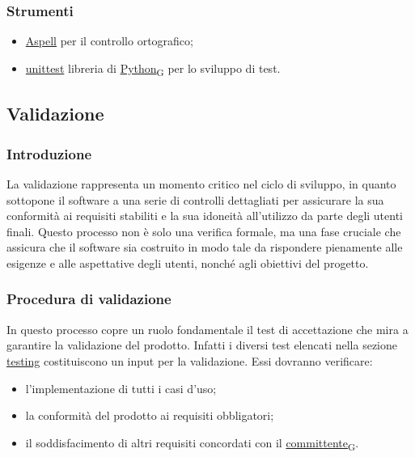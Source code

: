 \subsubsection{Strumenti}

\begin{itemize}
	\item \href{http://aspell.net/}{Aspell} per il controllo ortografico;
	\item \href{https://docs.python.org/3/library/unittest.html}{unittest} libreria di \href{https://7last.github.io/docs/pb/documentazione-interna/glossario\#python}{Python\textsubscript{G}} per lo sviluppo di test.
\end{itemize}



\subsection{Validazione}
\subsubsection{Introduzione}
La validazione rappresenta un momento critico nel ciclo di sviluppo, in quanto sottopone il software a una serie di controlli dettagliati per assicurare la sua conformità ai requisiti stabiliti e la sua idoneità all'utilizzo da parte degli utenti finali. Questo processo non è solo una verifica formale, ma una fase cruciale che assicura che il software sia costruito in modo tale da rispondere pienamente alle esigenze e alle aspettative degli utenti, nonché agli obiettivi del progetto.

\subsubsection{Procedura di validazione}
In questo processo copre un ruolo fondamentale il test di accettazione che mira a garantire la validazione
del prodotto. Infatti i diversi test elencati nella sezione \underline{\hyperlink{testing}{testing}} costituiscono un input
per la validazione. Essi dovranno verificare:
\begin{itemize}
	\item l'implementazione di tutti i casi d'uso;
	\item la conformità del prodotto ai requisiti obbligatori;
	\item il soddisfacimento di altri requisiti concordati con il \href{https://7last.github.io/docs/pb/documentazione-interna/glossario\#committente}{committente\textsubscript{G}}.
\end{itemize}

